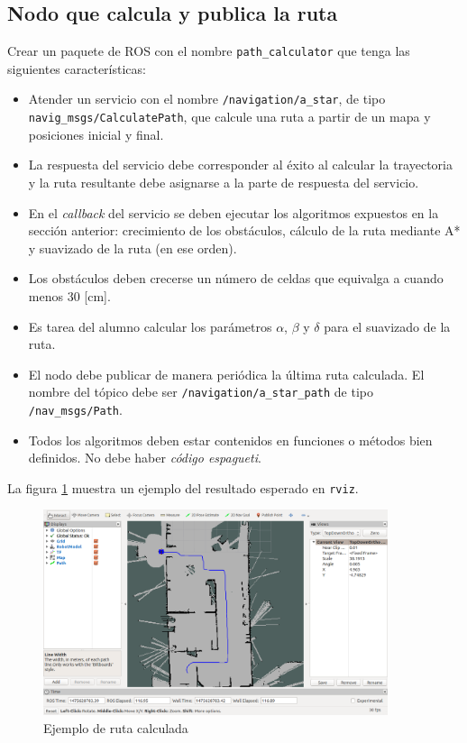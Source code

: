 \documentclass[letterpaper,12pt]{article}
\begin{document}
\subsection{Nodo que calcula y publica la ruta}
Crear un paquete de ROS con el nombre \texttt{path\_calculator} que tenga las siguientes características:
\begin{itemize}
\item Atender un servicio con el nombre \texttt{/navigation/a\_star}, de tipo \texttt{navig\_msgs/CalculatePath}, que calcule una ruta a partir de un mapa y posiciones inicial y final. 
\item La respuesta del servicio debe corresponder al éxito al calcular la trayectoria y la ruta resultante debe asignarse a la parte de respuesta del servicio.
\item En el \textit{callback} del servicio se deben ejecutar los algoritmos expuestos en la sección anterior: crecimiento de los obstáculos, cálculo de la ruta mediante A* y suavizado de la ruta (en ese orden).
\item Los obstáculos deben crecerse un número de celdas que equivalga a cuando menos 30 [cm].
\item Es tarea del alumno calcular los parámetros $\alpha$, $\beta$ y $\delta$ para el suavizado de la ruta.
\item El nodo debe publicar de manera periódica la última ruta calculada. El nombre del tópico debe ser \texttt{/navigation/a\_star\_path} de tipo \texttt{/nav\_msgs/Path}.
\item Todos los algoritmos deben estar contenidos en funciones o métodos bien definidos. No debe haber \textit{código espagueti}.
\end{itemize}

La figura \ref{fig:path} muestra un ejemplo del resultado esperado en \texttt{rviz}.
\begin{figure}
\centering
\includegraphics[width=0.9\textwidth]{Figures/Path.png}
\caption{Ejemplo de ruta calculada}
\label{fig:path}
\end{figure}
\end{document}
